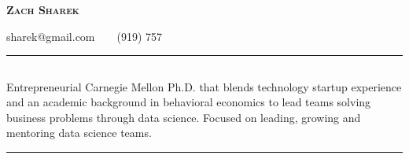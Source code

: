 \documentclass[12pt,letterpaper,oneside]{article}
\makeatletter
\newcommand{\headerrow}[2]
{\begin{tabular*}{\linewidth}{l@{\extracolsep{\fill}}r}
	#1 &
	#2 \\
\end{tabular*}}
\makeatother
\begin{document}
\begin{center}
{\LARGE \textbf{\textsc{Zach Sharek}}}
\vspace{0.1em}

	{sharek@gmail.com\ \ \textbullet \ \ (919) 757}	
\end{center}
\vspace{0.5em}

\hrule
\vspace{-1em}
\subsection*{}

\vspace{-0.7em}
Entrepreneurial Carnegie Mellon Ph.D. that blends technology startup experience and an academic background in behavioral economics to lead teams solving business problems through data science. Focused on leading, growing and mentoring data science teams. 
\vspace{1em}
\hrule
\vspace{-0.4em}
\end{document}
